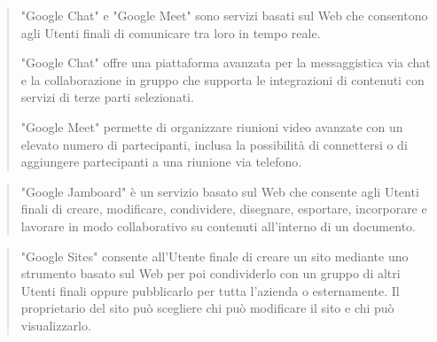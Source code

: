 \begin{quotation}
\textenglish{"Google Chat"} e   \textenglish{"Google Meet"} sono servizi basati sul Web che consentono agli Utenti finali di comunicare tra loro in tempo reale.
  
	\textenglish{"Google Chat"} offre una piattaforma avanzata per la messaggistica via chat e la collaborazione in gruppo che supporta le integrazioni di contenuti con servizi di terze parti selezionati. 	
	
	\textenglish{"Google Meet"} permette di organizzare riunioni video avanzate con un elevato numero di partecipanti, inclusa la possibilità di connettersi o di aggiungere partecipanti a una riunione via telefono.
	\end{quotation}
	
\begin{quotation}
	 \textenglish{"Google Jamboard"} è un servizio basato sul Web che consente agli Utenti finali di creare, modificare, condividere, disegnare, esportare, incorporare e lavorare in modo collaborativo su contenuti all'interno di un documento.
\end{quotation}

	\begin{quotation}
		\textenglish{"Google Sites"} consente all'Utente finale di creare un sito mediante uno strumento basato sul Web per poi condividerlo con un gruppo di altri Utenti finali oppure pubblicarlo per tutta l'azienda o esternamente. Il proprietario del sito può scegliere chi può modificare il sito e chi può visualizzarlo.
	\end{quotation}
	
